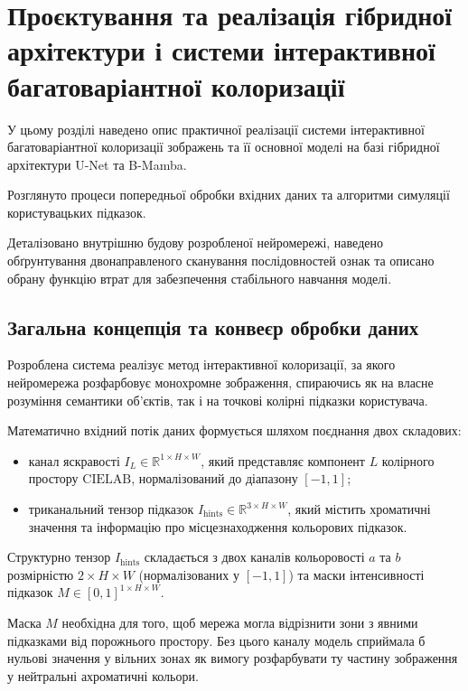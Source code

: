 
\chapter{Проєктування та реалізація гібридної архітектури і системи інтерактивної багатоваріантної колоризації}
\label{chap:implementation}
    У цьому розділі наведено опис практичної реалізації системи інтерактивної багатоваріантної колоризації зображень та її основної моделі на базі гібридної архітектури U-Net та B-Mamba. 
    
    Розглянуто процеси попередньої обробки вхідних даних та алгоритми симуляції користувацьких підказок.
    
    Деталізовано внутрішню будову розробленої нейромережі,
    наведено обґрунтування двонаправленого сканування послідовностей ознак
    та описано обрану функцію втрат для забезпечення стабільного навчання моделі.

    \section{Загальна концепція та конвеєр обробки даних}
        Розроблена система реалізує метод інтерактивної колоризації,
        за якого нейромережа розфарбовує монохромне зображення,
        спираючись як на власне розуміння семантики об'єктів,
        так і на точкові колірні підказки користувача.
    
        Математично вхідний потік даних формується шляхом поєднання двох складових:
        \begin{itemize}[label=$\bullet$]
            \item канал яскравості $I_L \in \mathbb{R}^{1 \times H \times W}$, який представляє компонент $L$ колірного простору $\mathrm{CIELAB}$, нормалізований до діапазону $[-1, 1]$;
            \item триканальний тензор підказок $I_{\mathrm{hints}} \in \mathbb{R}^{3 \times H \times W}$, який містить хроматичні значення та інформацію про місцезнаходження кольорових підказок.
        \end{itemize}

        Структурно тензор $I_{\mathrm{hints}}$ складається з двох каналів кольоровості $a$ та $b$ розмірністю $2 \times H \times W$ (нормалізованих у $[-1, 1]$) та маски інтенсивності підказок $M \in [0, 1]^{1 \times H \times W}$.
        
        Маска $M$ необхідна для того, щоб мережа могла відрізнити зони з явними підказками від порожнього простору. Без цього каналу модель сприймала б нульові значення у вільних зонах як вимогу розфарбувати ту частину зображення у нейтральні ахроматичні кольори.

